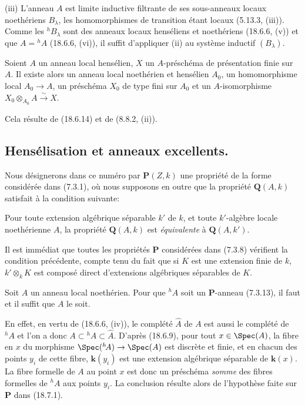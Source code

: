 (iii) L'anneau $A$ est limite inductive filtrante de ses sous-anneaux locaux noethériens $B_\lambda$, les homomorphismes de transition étant locaux (5.13.3, (iii)). Comme les ${}^h\!B_\lambda$ sont des anneaux locaux henséliens et noethériens (18.6.6, (v)) et que $A={}^h\!A$ (18.6.6, (vi)), il suffit d'appliquer (ii) au système inductif $(B_\lambda)$.

\begin{corollary}[18.6.15]
\label{IV.18.6.15}
Soient $A$ un anneau local hensélien, $X$ un $A$-préschéma de présentation finie sur $A$. Il existe alors un anneau local noethérien et hensélien $A_0$, un homomorphisme local $A_0\to A$, un préschéma $X_0$ de type fini sur $A_0$ et un $A$-isomorphisme $X_0\otimes_{A_0}A\xrightarrow{\sim}X$.
\end{corollary}

Cela résulte de (18.6.14) et de (8.8.2, (ii)).

\subsection{Hensélisation et anneaux excellents.}

\begin{env}[18.7.1]
\label{IV.18.7.1}
Nous désignerons dans ce numéro par $\boldsymbol{P}(Z,k)$ une propriété de la forme considérée dans (7.3.1), où nous supposons en outre que la propriété $\boldsymbol{Q}(A,k)$ satisfait à la condition suivante:

Pour toute extension algébrique séparable $k'$ de $k$, et toute $k'$-algèbre locale noethérienne $A$, la propriété $\boldsymbol{Q}(A,k)$ est \emph{équivalente} à $\boldsymbol{Q}(A,k')$.

Il est immédiat que toutes les propriétés $\boldsymbol{P}$ considérées dans (7.3.8) vérifient la condition précédente, compte tenu du fait que si $K$ est une extension finie de $k$, $k'\otimes_k K$ est composé direct d'extensions algébriques séparables de $K$.
\end{env}


\begin{proposition}[18.7.2]
\label{IV.18.7.2}
Soit $A$ un anneau local noethérien. Pour que ${}^h\!A$ soit un $\boldsymbol{P}$-anneau \textup{(7.3.13)}, il faut et il suffit que $A$ le soit.
\end{proposition}

En effet, en vertu de (18.6.6, (iv)), le complété $\widehat A$ de $A$ est aussi le complété de ${}^h\!A$ et l'on a donc $A\subset{}^h\!A\subset\widehat A$. D'après (18.6.9), pour tout $x\in\Spec(A)$, la fibre en $x$ du morphisme $\Spec({}^h\!A)\to\Spec(A)$ est discrète et finie, et en chacun des points $y_i$ de cette fibre, $\boldsymbol{k}(y_i)$ est une extension algébrique séparable de $\boldsymbol{k}(x)$. La fibre formelle de $A$ au point $x$ est donc un préschéma \emph{somme} des fibres formelles de ${}^h\!A$ aux points $y_i$. La conclusion résulte alors de l'hypothèse faite sur $\boldsymbol{P}$ dans (18.7.1).

